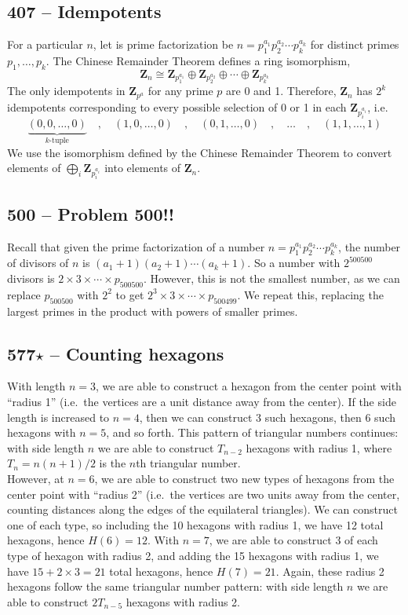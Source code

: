 \documentclass{article}
\begin{document}
\subsection*{407 -- Idempotents} 
For a particular $n$, let is prime factorization be $n = p_1^{a_1} p_2^{a_2} \cdots p_k^{a_k}$ for distinct primes $p_1, \dotsc , p_k$.
The Chinese Remainder Theorem defines a ring isomorphism,
\[ \mathbf{Z}_n \cong \mathbf{Z}_{p_1^{a_1}} \oplus  \mathbf{Z}_{p_2^{a_2}} \oplus \cdots \oplus \mathbf{Z}_{p_k^{a_k}} \]
The only idempotents in $\mathbf{Z}_{p^a}$ for any prime $p$ are 0 and 1.
Therefore, $\mathbf{Z}_n$ has $2^k$ idempotents corresponding to every possible selection of 0 or 1 in each $\mathbf{Z}_{p_i^{a_i}}$, i.e.
\[ \underbrace{(0, 0, \dotsc, 0)}_{k \text{-tuple}} \quad,\quad (1, 0, \dotsc, 0) \quad,\quad (0, 1, \dotsc, 0) \quad , \quad \dotsc \quad , \quad (1, 1, \dotsc, 1) \]
We use the isomorphism defined by the Chinese Remainder Theorem to convert elements of $\bigoplus_i \mathbf{Z}_{p_i^{a_i}}$ into elements of $\mathbf{Z}_n $.


\subsection*{500 -- Problem 500!!} 
Recall that given the prime factorization of a number $n = p_1^{a_1} p_2^{a_2} \dotsb p_k^{a_k}$, the number of divisors of $n$ is $(a_1 + 1)(a_2 + 1)\cdots(a_k+1)$. 
So a number with $2^{500500}$ divisors is $2\times 3\times\cdots\times p_{500500}$. 
However, this is not the smallest number, as we can replace $p_{500500}$ with $2^2$ to get $2^3\times3\times\cdots\times p_{500499}$. 
We repeat this, replacing the largest primes in the product with powers of smaller primes.

\subsection*{577$\star$ -- Counting hexagons}
With length $n=3$, we are able to construct a hexagon from the center point with ``radius 1'' (i.e.~the vertices are a unit distance away from the center).
If the side length is increased to $n=4$, then we can construct 3 such hexagons, then 6 such hexagons with $n=5$, and so forth.
This pattern of triangular numbers continues: with side length $n$ we are able to construct $T_{n-2}$ hexagons with radius 1, where $T_n = n(n+1)/2$ is the $n$th triangular number. \\

However, at $n=6$, we are able to construct two new types of hexagons from the center point with ``radius 2'' (i.e.~the vertices are two units away from the center, counting distances along the edges of the equilateral triangles). 
We can construct one of each type, so including the 10 hexagons with radius 1, we have 12 total hexagons, hence $H(6)=12$.
With $n=7$, we are able to construct 3 of each type of hexagon with radius 2, and adding the 15 hexagons with radius 1, we have $15 + 2\times 3 = 21$ total hexagons, hence $H(7)=21$.
Again, these radius 2 hexagons follow the same triangular number pattern: with side length $n$ we are able to construct $2T_{n-5}$ hexagons with radius 2. \\
\end{document}
